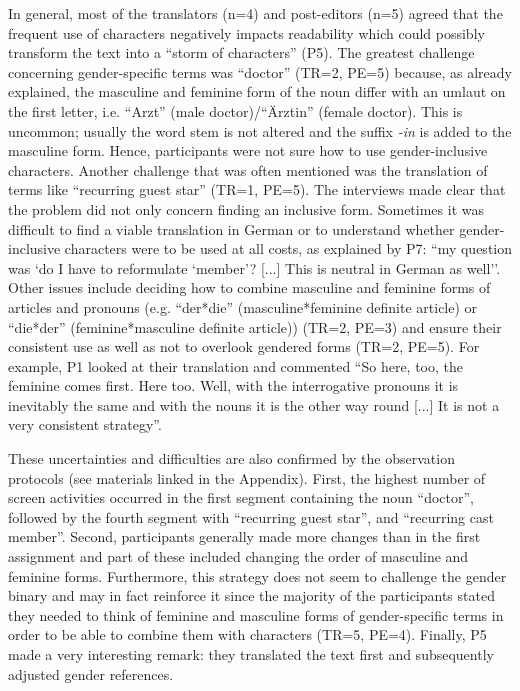 In general, most of the translators (n=4) and post-editors (n=5) agreed that the frequent use of characters negatively impacts readability which could possibly transform the text into a ``storm of characters'' (P5). The greatest challenge concerning gender-specific terms was ``doctor'' (TR=2, PE=5) because, as already explained, the masculine and feminine form of the noun differ with an umlaut on the first letter, i.e. ``Arzt'' (male doctor)/``Ärztin'' (female doctor). This is uncommon; usually the word stem is not altered and the suffix \textit{-in} is added to the masculine form. Hence, participants were not sure how to use gender-inclusive characters. Another challenge that was often mentioned was the translation of terms like ``recurring guest star'' (TR=1, PE=5). The interviews made clear that the problem did not only concern finding an inclusive form. Sometimes it was difficult to find a viable translation in German or to understand whether gender-inclusive characters were to be used at all costs, as explained by P7: ``my question was `do I have to reformulate `member'? [...] This is neutral in German as well''.
Other issues include deciding how to combine masculine and feminine forms of articles and pronouns (e.g. ``der*die'' (masculine*feminine definite article) or ``die*der'' (feminine*masculine definite article)) (TR=2, PE=3) and ensure their consistent use as well as not to overlook gendered forms (TR=2, PE=5). For example, P1 looked at their translation and commented ``So here, too, the feminine comes first. Here too. Well, with the interrogative pronouns it is inevitably the same and with the nouns it is the other way round [...] It is not a very consistent strategy''. 

These uncertainties and difficulties are also confirmed by the observation protocols (see materials linked in the Appendix). First, the highest number of screen activities occurred in the first segment containing the noun ``doctor'', followed by the fourth segment with ``recurring guest star'', and ``recurring cast member''. Second, participants generally made more changes than in the first assignment and part of these included changing the order of masculine and feminine forms. Furthermore, this strategy does not seem to challenge the gender binary and may in fact reinforce it since the majority of the participants stated they needed to think of feminine and masculine forms of gender-specific terms in order to be able to combine them with characters (TR=5, PE=4). Finally, P5 made a very interesting remark: they translated the text first and subsequently adjusted gender references. 


